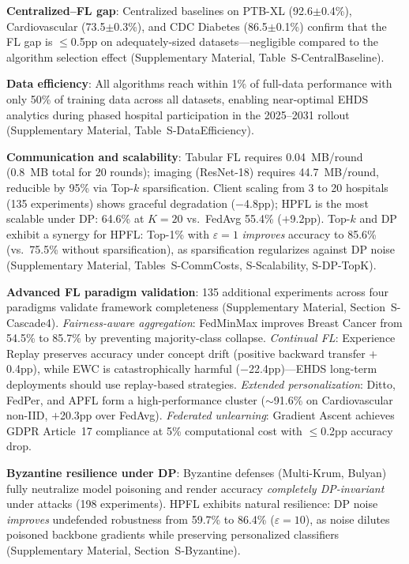 \documentclass[conference]{IEEEtran}
\begin{document}
\textbf{Centralized--FL gap}: Centralized baselines on PTB-XL (92.6$\pm$0.4\%), Cardiovascular (73.5$\pm$0.3\%), and CDC Diabetes (86.5$\pm$0.1\%) confirm that the FL gap is $\leq$0.5pp on adequately-sized datasets---negligible compared to the algorithm selection effect (Supplementary Material, Table~S-CentralBaseline).

\textbf{Data efficiency}: All algorithms reach within 1\% of full-data performance with only 50\% of training data across all datasets, enabling near-optimal EHDS analytics during phased hospital participation in the 2025--2031 rollout (Supplementary Material, Table~S-DataEfficiency).

\textbf{Communication and scalability}: Tabular FL requires 0.04~MB/round (0.8~MB total for 20 rounds); imaging (ResNet-18) requires 44.7~MB/round, reducible by 95\% via Top-$k$ sparsification. Client scaling from 3 to 20 hospitals (135 experiments) shows graceful degradation ($-$4.8pp); HPFL is the most scalable under DP: 64.6\% at $K{=}20$ vs.\ FedAvg 55.4\% ($+$9.2pp). Top-$k$ and DP exhibit a synergy for HPFL: Top-1\% with $\varepsilon{=}1$ \textit{improves} accuracy to 85.6\% (vs.\ 75.5\% without sparsification), as sparsification regularizes against DP noise (Supplementary Material, Tables~S-CommCosts, S-Scalability, S-DP-TopK).

\textbf{Advanced FL paradigm validation}: 135 additional experiments across four paradigms validate framework completeness (Supplementary Material, Section~S-Cascade4). \textit{Fairness-aware aggregation}: FedMinMax improves Breast Cancer from 54.5\% to 85.7\% by preventing majority-class collapse. \textit{Continual FL}: Experience Replay preserves accuracy under concept drift (positive backward transfer $+$0.4pp), while EWC is catastrophically harmful ($-$22.4pp)---EHDS long-term deployments should use replay-based strategies. \textit{Extended personalization}: Ditto, FedPer, and APFL form a high-performance cluster ($\sim$91.6\% on Cardiovascular non-IID, $+$20.3pp over FedAvg). \textit{Federated unlearning}: Gradient Ascent achieves GDPR Article~17 compliance at 5\% computational cost with $\leq$0.2pp accuracy drop.

\textbf{Byzantine resilience under DP}: Byzantine defenses (Multi-Krum, Bulyan) fully neutralize model poisoning and render accuracy \textit{completely DP-invariant} under attacks (198 experiments). HPFL exhibits natural resilience: DP noise \textit{improves} undefended robustness from 59.7\% to 86.4\% ($\varepsilon{=}10$), as noise dilutes poisoned backbone gradients while preserving personalized classifiers (Supplementary Material, Section~S-Byzantine).
\end{document}
